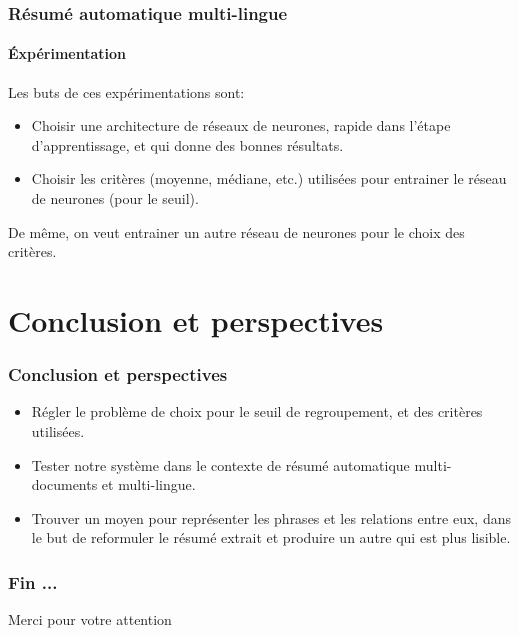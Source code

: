 \documentclass{beamer}
\begin{document}
\begin{frame}
\frametitle{Résumé automatique multi-lingue}
\framesubtitle{\'Expérimentation}
Les buts de ces expérimentations sont:
\begin{itemize}
\item Choisir une architecture de réseaux de neurones, rapide dans l'étape d'apprentissage, et qui donne des bonnes résultats.
\item Choisir les critères (moyenne, médiane, etc.) utilisées pour entrainer le réseau de neurones (pour le seuil).
\end{itemize}
De même, on veut entrainer un autre réseau de neurones pour le choix des critères.
\end{frame}

\section{Conclusion et perspectives}
\begin{frame}
\frametitle{Conclusion et perspectives}

\begin{itemize}

\item Régler le problème de choix pour le seuil de regroupement, et des critères utilisées. 

\item Tester notre système dans le contexte de résumé automatique multi-documents et multi-lingue.

\item \color{red} Trouver un moyen pour représenter les phrases et les relations entre eux, dans le but de reformuler le résumé extrait et produire un autre qui est plus lisible.

\end{itemize}
\end{frame}

\begin{frame}
\frametitle{Fin ...}

\begin{center}
{\Huge Merci pour votre attention}
\end{center}
\end{frame}


\end{document}
